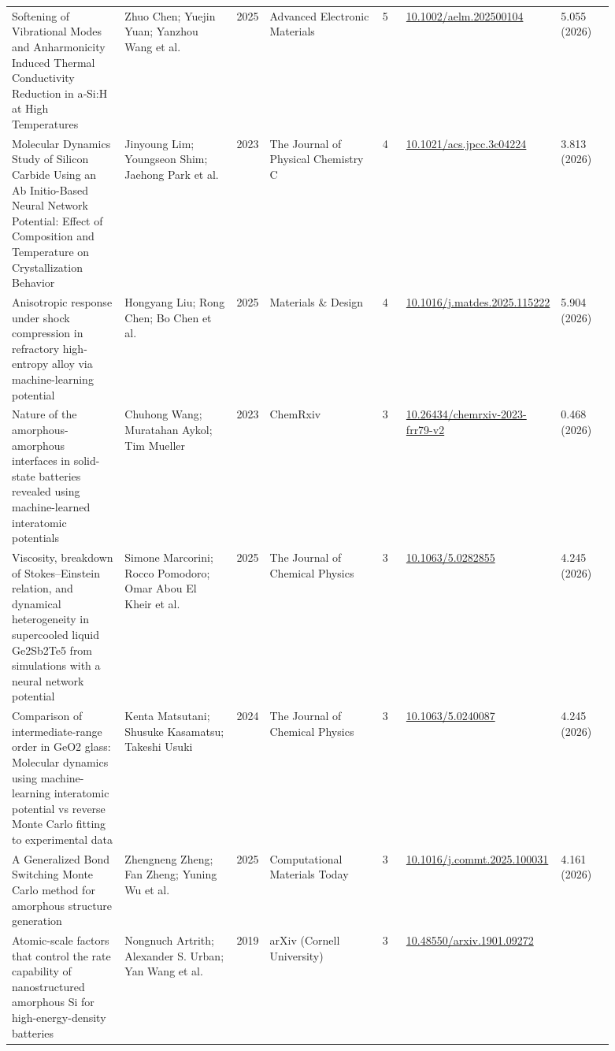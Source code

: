 \documentclass[10pt,a4paper]{article}
\begin{document}
{\begin{longtable}{p{0.192\linewidth}p{0.192\linewidth}p{0.043\linewidth}p{0.192\linewidth}p{0.043\linewidth}p{0.132\linewidth}p{0.096\linewidth}}
Softening of Vibrational Modes and Anharmonicity Induced Thermal Conductivity Reduction in a‐Si:H at High Temperatures & Zhuo Chen; Yuejin Yuan; Yanzhou Wang et al. & 2025 & Advanced Electronic Materials & 5 & \href{https://doi.org/10.1002/aelm.202500104}{10.1002/aelm.202500104} & 5.055 (2026) \\
Molecular Dynamics Study of Silicon Carbide Using an Ab Initio-Based Neural Network Potential: Effect of Composition and Temperature on Crystallization Behavior & Jinyoung Lim; Youngseon Shim; Jaehong Park et al. & 2023 & The Journal of Physical Chemistry C & 4 & \href{https://doi.org/10.1021/acs.jpcc.3c04224}{10.1021/acs.jpcc.3c04224} & 3.813 (2026) \\
Anisotropic response under shock compression in refractory high-entropy alloy via machine-learning potential & Hongyang Liu; Rong Chen; Bo Chen et al. & 2025 & Materials \& Design & 4 & \href{https://doi.org/10.1016/j.matdes.2025.115222}{10.1016/j.matdes.2025.115222} & 5.904 (2026) \\
Nature of the amorphous-amorphous interfaces in solid-state batteries revealed using machine-learned interatomic potentials & Chuhong Wang; Muratahan Aykol; Tim Mueller & 2023 & ChemRxiv & 3 & \href{https://doi.org/10.26434/chemrxiv-2023-frr79-v2}{10.26434/chemrxiv-2023-frr79-v2} & 0.468 (2026) \\
Viscosity, breakdown of Stokes–Einstein relation, and dynamical heterogeneity in supercooled liquid Ge2Sb2Te5 from simulations with a neural network potential & Simone Marcorini; Rocco Pomodoro; Omar Abou El Kheir et al. & 2025 & The Journal of Chemical Physics & 3 & \href{https://doi.org/10.1063/5.0282855}{10.1063/5.0282855} & 4.245 (2026) \\
Comparison of intermediate-range order in GeO2 glass: Molecular dynamics using machine-learning interatomic potential vs reverse Monte Carlo fitting to experimental data & Kenta Matsutani; Shusuke Kasamatsu; Takeshi Usuki & 2024 & The Journal of Chemical Physics & 3 & \href{https://doi.org/10.1063/5.0240087}{10.1063/5.0240087} & 4.245 (2026) \\
A Generalized Bond Switching Monte Carlo method for amorphous structure generation & Zhengneng Zheng; Fan Zheng; Yuning Wu et al. & 2025 & Computational Materials Today & 3 & \href{https://doi.org/10.1016/j.commt.2025.100031}{10.1016/j.commt.2025.100031} & 4.161 (2026) \\
Atomic-scale factors that control the rate capability of nanostructured amorphous Si for high-energy-density batteries & Nongnuch Artrith; Alexander S. Urban; Yan Wang et al. & 2019 & arXiv (Cornell University) & 3 & \href{https://doi.org/10.48550/arxiv.1901.09272}{10.48550/arxiv.1901.09272} &  \\

\end{longtable}}
\end{document}
